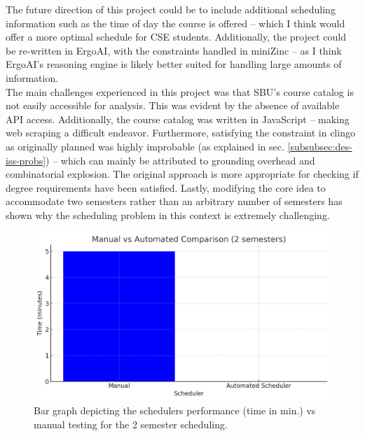 \documentclass[12pt]{article}
\begin{document}
    The future direction of this project could be to include additional scheduling information such as the time of day the course is offered -- which I think would offer a more optimal schedule for CSE students. Additionally, the project could be re-written in ErgoAI, with the constraints handled in miniZinc -- as I think ErgoAI's reasoning engine is likely better suited for handling large amounts of information. \\
    The main challenges experienced in this project was that SBU's course catalog is not easily accessible for analysis. This was evident by the absence of available API access. Additionally, the course catalog was written in JavaScript -- making web scraping a difficult endeavor. Furthermore, satisfying the constraint in clingo as originally planned was highly improbable (as explained in sec. \ref{subsubsec:des-iss-probs}) -- which can mainly be attributed to grounding overhead and combinatorial explosion. The original approach is more appropriate for checking if degree requirements have been satisfied. Lastly, modifying the core idea to accommodate two semesters rather than an arbitrary number of semesters has shown why the scheduling problem in this context is extremely challenging.


    \begin{figure}[h!]
        \centering
        \includegraphics[scale=0.5]{figures/eval/bar-graph-2sem.png}
        \caption{Bar graph depicting the schedulers performance (time in min.) vs manual testing for the 2 semester scheduling.}
        \label{fig:2sem}
    \end{figure}
\end{document}
